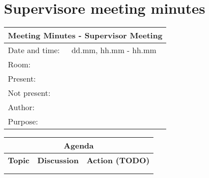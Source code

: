 \section{Supervisore meeting minutes}
\begin{tabular}{| p{3cm} | p{9cm} |}
	\hline
	\multicolumn{2}{|c|}{\Large \bf Meeting Minutes - Supervisor Meeting} \\ \hline
	Date and time: & dd.mm,  hh.mm - hh.mm \\ \hline
	Room: &  \\ \hline
	Present: &  \\ \hline
	Not present: &  \\ \hline
	Author: &  \\ \hline
	Purpose: &  \\ \hline
\end{tabular}

\begin{tabular}{| p{} | p{} | p{} |}
	\hline
	\multicolumn{3}{|c|}{\Large \bf Agenda} \\ \hline
	{\bf Topic} & {\bf Discussion} & {\bf Action (TODO)} \\ \hline
	& & \\ \hline
	& & \\ \hline
\end{tabular}